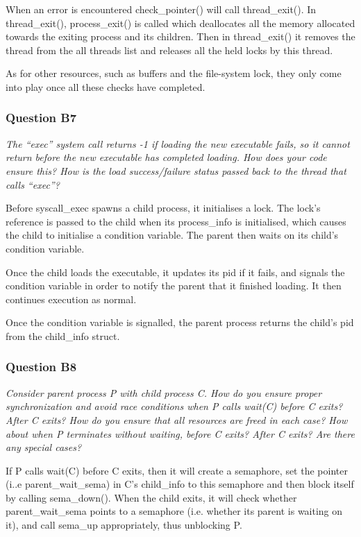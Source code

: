 When an error is encountered check\_pointer() will call thread\_exit(). In thread\_exit(), process\_exit() is called which deallocates all the memory allocated towards the exiting process and its children.
Then in thread\_exit() it removes the thread from the all threads list and releases all the held locks by this thread.

As for other resources, such as buffers and the file-system lock, they only come into play once all these checks have completed.

\subsubsection*{Question B7} %
\textit{The ``exec'' system call returns -1 if loading the new executable fails, so it cannot return before the new executable has completed loading.  How does your code ensure this?  How is the load success/failure status passed back to the thread that calls ``exec''?}

Before syscall\_exec spawns a child process, it initialises a lock. The lock's reference is passed to the child when its process\_info is initialised, which causes the child to initialise a condition variable. The parent then waits on its child's condition variable.

Once the child loads the executable, it updates its pid if it fails, and signals the condition variable in order to notify the parent that it finished loading. It then continues execution as normal.

Once the condition variable is signalled, the parent process returns the child's pid from the child\_info struct.

\subsubsection*{Question B8} %
\textit{Consider parent process P with child process C.  How do you ensure proper synchronization and avoid race conditions when P calls wait(C) before C exits?  After C exits?  How do you ensure that all resources are freed in each case?  How about when P terminates without waiting, before C exits?  After C exits?  Are there any special cases?}

If P calls wait(C) before C exits, then it will create a semaphore, set the pointer (i..e parent\_wait\_sema) in C's child\_info to this semaphore and then block itself by calling sema\_down(). When the child exits, it will check whether parent\_wait\_sema points to a semaphore (i.e. whether its parent is waiting on it), and call sema\_up appropriately, thus unblocking P.

